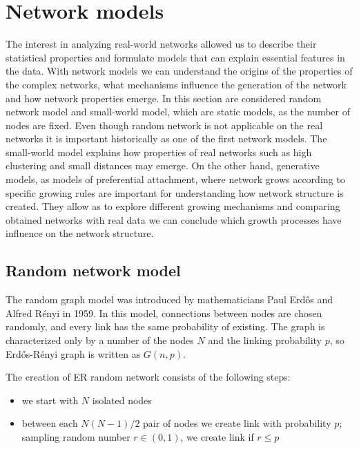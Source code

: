 \newpage
\section{Network models}

The interest in analyzing real-world networks allowed us to describe their statistical properties and formulate models that can explain essential features in the data. With network models we can understand the origins of the properties of the complex networks, what mechanisms influence the generation of the network and how network properties emerge. In this section are considered random network model and small-world model, which are static models, as the number of nodes are fixed. Even though random network is not applicable on the real networks it is important historically as one of the first network models. The small-world model explains how properties of real networks such as high clustering and small distances may emerge. On the other hand, generative models, as models of preferential attachment, where network grows according to specific growing rules are important for understanding how network structure is created. They allow as to explore different growing mechanisms and comparing obtained networks with real data we can conclude which growth processes have influence on the network structure.     

\subsection{Random network model}

The random graph model was introduced by mathematicians Paul Erdős and Alfred R\' {e}nyi in 1959. In this model, connections between nodes are chosen randomly, and every link has the same probability of existing. The graph is characterized only by a number of the nodes $N$ and the linking probability $p$, so Erdős-R\' {e}nyi graph is written as $G(n, p)$. 

The creation of ER random network consists of the following steps:
\begin{itemize}
	\item we start with $N$ isolated nodes
	\item between each $N(N-1)/2$ pair of nodes we create link with probability $p$; sampling random number $r \in (0,1)$, we create link if $r \leq p$    
\end{itemize}


